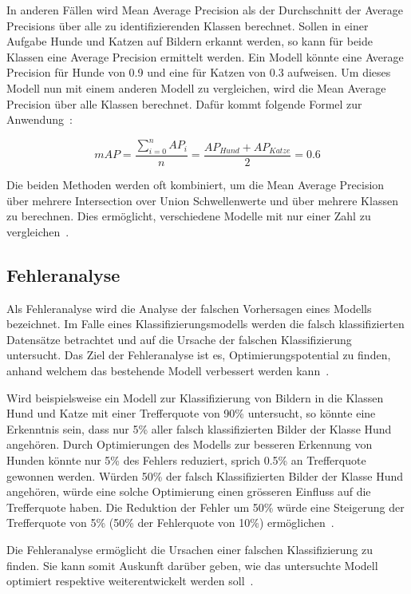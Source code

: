 In anderen Fällen wird Mean Average Precision als der Durchschnitt der Average Precisions über alle zu identifizierenden Klassen berechnet. Sollen in einer Aufgabe Hunde und Katzen auf Bildern erkannt werden, so kann für beide Klassen eine Average Precision ermittelt werden. Ein Modell könnte eine Average Precision für Hunde von 0.9 und eine für Katzen von 0.3 aufweisen. Um dieses Modell nun mit einem anderen Modell zu vergleichen, wird die Mean Average Precision über alle Klassen berechnet. Dafür kommt folgende Formel zur Anwendung~\autocite{AP}:

\nopagebreak
$$mAP = \frac{\sum_{i=0}^{n}AP_{i}}{n} = \frac{AP_{Hund}+AP_{Katze}}{2} = 0.6$$
\vspace*{0.2cm}

Die beiden Methoden werden oft kombiniert, um die Mean Average Precision über mehrere Intersection over Union Schwellenwerte und über mehrere Klassen zu berechnen. Dies ermöglicht, verschiedene Modelle mit nur einer Zahl zu vergleichen~\autocite{AP}.

\subsection{Fehleranalyse}
\label{chap:error-analysis}

Als Fehleranalyse wird die Analyse der falschen Vorhersagen eines Modells bezeichnet. Im Falle eines Klassifizierungsmodells werden die falsch klassifizierten Datensätze betrachtet und auf die Ursache der falschen Klassifizierung untersucht. Das Ziel der Fehleranalyse ist es, Optimierungspotential zu finden, anhand welchem das bestehende Modell verbessert werden kann~\autocite{MLYearning}.

Wird beispielsweise ein Modell zur Klassifizierung von Bildern in die Klassen Hund und Katze mit einer Trefferquote von 90\% untersucht, so könnte eine Erkenntnis sein, dass nur 5\% aller falsch klassifizierten Bilder der Klasse Hund angehören. Durch Optimierungen des Modells zur besseren Erkennung von Hunden könnte nur 5\% des Fehlers reduziert, sprich 0.5\% an Trefferquote gewonnen werden. Würden 50\% der falsch Klassifizierten Bilder der Klasse Hund angehören, würde eine solche Optimierung einen grösseren Einfluss auf die Trefferquote haben. Die Reduktion der Fehler um 50\% würde eine Steigerung der Trefferquote von 5\% (50\% der Fehlerquote von 10\%) ermöglichen~\autocite{MLYearning}.

Die Fehleranalyse ermöglicht die Ursachen einer falschen Klassifizierung zu finden. Sie kann somit Auskunft darüber geben, wie das untersuchte Modell optimiert respektive weiterentwickelt werden soll~\autocite{MLYearning}.

